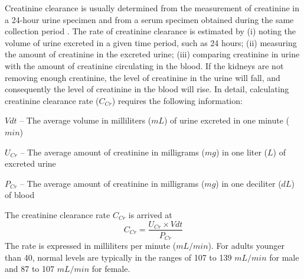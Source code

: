 \documentclass[11pt]{article}
\begin{document}
\begin{enumerate*}[{[a)]}]
    Creatinine clearance is usually determined from the measurement of creatinine in a 24-hour urine specimen and from a serum specimen obtained during the same collection period \citep{traynor2006measure}. The rate of creatinine clearance is estimated by (i) noting the volume of urine excreted in a given time period, such as 24 hours; (ii) measuring the amount of creatinine in the excreted urine; (iii) comparing creatinine in urine with the amount of creatinine circulating in the blood. If the kidneys are not removing enough creatinine, the level of creatinine in the urine will fall, and consequently the level of creatinine in the blood will rise. In detail, calculating creatinine clearance rate ($C_{Cr}$) requires the following information:
    \begin{itemize*}
        \item $Vdt$ -- The average volume in milliliters ($mL$) of urine excreted in one minute ($min$)
        \item $U_{Cr}$ -- The average amount of creatinine in milligrams ($mg$) in one liter ($L$) of excreted urine
        \item $P_{Cr}$ -- The average amount of creatinine in milligrams ($mg$) in one deciliter ($dL$) of blood
    \end{itemize*}
    The creatinine clearance rate $C_{Cr}$ is arrived at 
    \begin{equation*}
        C_{Cr} = \frac{U_{Cr}\times Vdt}{P_{Cr}}
    \end{equation*}
    The rate is expressed in milliliters per minute ($mL/min$). For adults younger than 40, normal levels are typically in the ranges of 107 to 139 $mL/min$ for male and 87 to 107 $mL/min$ for female.
    

\end{enumerate*}
\end{document}
